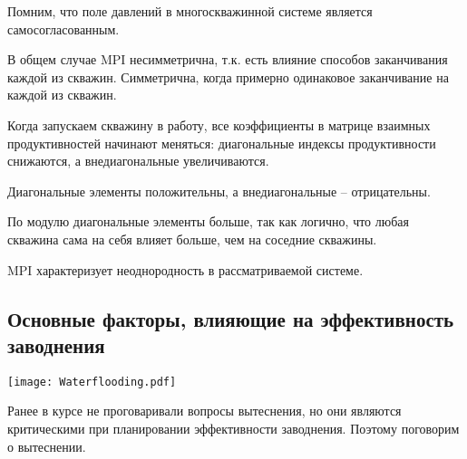 \documentclass[main.tex]{subfiles}
\begin{document}
Помним, что поле давлений в многоскважинной системе является самосогласованным.


В общем случае MPI несимметрична, т.к. есть влияние способов заканчивания каждой из скважин. Симметрична, когда примерно одинаковое заканчивание на каждой из скважин.

Когда запускаем скважину в работу, все коэффициенты в матрице взаимных продуктивностей начинают меняться: диагональные индексы продуктивности снижаются, а внедиагональные увеличиваются.

Диагональные элементы положительны, а внедиагональные -- отрицательны.

По модулю диагональные элементы больше, так как логично, что любая скважина сама на себя влияет больше, чем на соседние скважины.

MPI характеризует неоднородность в рассматриваемой системе.











\subsection{Основные факторы, влияющие на эффективность заводнения}

\texttt{[image: Waterflooding.pdf]}

Ранее в курсе не проговаривали вопросы вытеснения, но они являются критическими при планировании эффективности заводнения. Поэтому поговорим о вытеснении.\\
\end{document}
